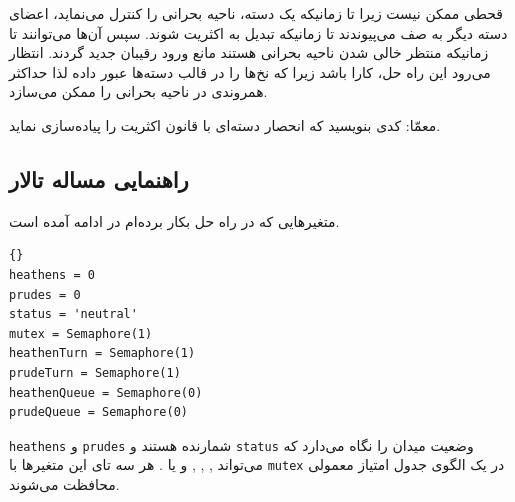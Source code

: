 \documentclass{book}
\newcommand{\clearemptydoublepage}{\newpage\cleardoublepage}
\begin{document}
    قحطی ممکن نیست زیرا تا زمانیکه یک دسته، ناحیه بحرانی را کنترل می‌نماید، اعضای دسته دیگر به صف می‌پیوندند تا زمانیکه 
    تبدیل به اکثریت شوند. سپس آن‌ها می‌توانند تا زمانیکه منتظر خالی شدن ناحیه بحرانی هستند مانع ورود رقیبان جدید گردند.
    انتظار می‌رود این راه حل، کارا باشد زیرا  که نخ‌ها را در قالب دسته‌ها عبور داده لذا حداکثر همروندی در 
    ناحیه بحرانی را ممکن می‌سازد. 

    معمّا: کدی بنویسید که انحصار دسته‌ای با قانون اکثریت را پیاده‌سازی نماید. 



\clearemptydoublepage
\subsection{راهنمایی مساله تالار  }

    متغیرهایی که در راه حل بکار برده‌ام در ادامه آمده است. 

\begin{latin}
\begin{lstlisting}[title=\rl{راهنمایی مساله تالار \lr{Modus}}]{}
heathens = 0
prudes = 0
status = 'neutral'
mutex = Semaphore(1)
heathenTurn = Semaphore(1)
prudeTurn = Semaphore(1)
heathenQueue = Semaphore(0)
prudeQueue = Semaphore(0)
\end{lstlisting}
\end{latin}

    {\tt heathens} و {\tt prudes} 
    شمارنده هستند و  {\tt status} وضعیت میدان را نگاه می‌دارد که می‌تواند 
    , ,
    ,  و یا . 
    هر سه تای این متغیرها با {\tt mutex} در یک الگوی جدول امتیاز معمولی محافظت می‌شوند. 
    
\end{document}
